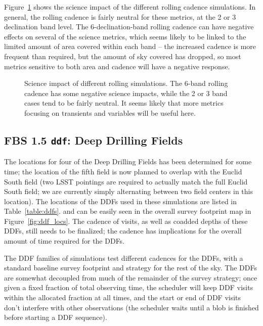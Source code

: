 Figure~\ref{fig:rolling_radar} shows the science impact of the different rolling cadence simulations. In general, the rolling cadence is fairly neutral for these metrics, at the 2 or 3 declination band level. The 6-declination-band rolling cadence can have negative effects on several of the science metrics, which seems likely to be linked to the limited amount of area covered within each band -- the increased cadence is more frequent than required, but the amount of sky covered has dropped, so most metrics sensitive to both area and cadence will have a negative response.

\begin{figure}
\caption{Science impact of different rolling simulations. The 6-band rolling cadence has some negative science impacts, while the 2 or 3 band cases tend to be fairly neutral. It seems likely that more metrics focusing on transients and variables will be useful here.}\label{fig:rolling_radar}
\end{figure}


\subsection{FBS 1.5 {\tt ddf}: Deep Drilling Fields}\label{ss:ddf}

The locations for four of the Deep Drilling Fields has been determined for some time; the location of the fifth field is now planned to overlap with the Euclid South field (two LSST pointings are required to actually match the full Euclid South field; we are currently simply alternating between two field centers in this location). The locations of the DDFs used in these simulations are listed in Table~\ref{table:ddfs}. and can be easily seen in the overall survey footprint map in Figure~\ref{fig:ddf_locs}. The cadence of visits, as well as coadded depths of these DDFs, still needs to be finalized; the cadence has implications for the overall amount of time required for the DDFs. 

The DDF families of simulations test different cadences for the DDFs, with a standard baseline survey footprint and strategy for the rest of the sky. The DDFs are somewhat decoupled from much of the remainder of the survey strategy; once given a fixed fraction of total observing time, the scheduler will keep DDF visits within the allocated fraction at all times, and the start or end of DDF visits don't interfere with other observations (the scheduler waits until a blob is finished before starting a DDF sequence). 

